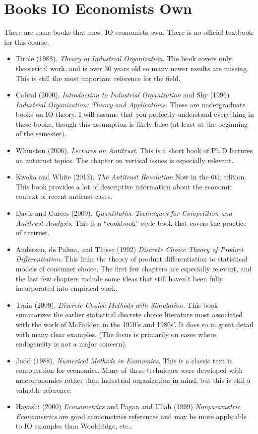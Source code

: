 \documentclass[11pt]{article}
\begin{document}
\section*{Books IO Economists Own}
These are some books that most IO economists own. There is no official textbook for this course.
\begin{itemize}
\item Tirole (1988). \textit{Theory of Industrial Organization}. The book covers only theoretical work, and is over 30 years old so many newer results are missing. This is still the most important reference for the field.
\item Cabral (2000). \textit{Introduction to Industrial Organization} and Shy (1996) \textit{Industrial Organization: Theory and Applications}. These are undergraduate books on IO theory. I will assume that you perfectly understand everything in these books, though this assumption is likely false (at least at the beginning of the semester).
\item Whinston (2006). \textit{Lectures on Antitrust}. This is a short book of Ph.D lectures on antitrust topics. The chapter on vertical issues is especially relevant.
\item Kwoka and White (2013). \textit{The Antitrust Revolution} Now in the 6th edition. This book provides a lot of descriptive information about the economic context of recent antirust cases.
\item Davis and Garces (2009). \textit{Quantitative Techniques for Competition and Antitrust Analysis}. This is a ``cookbook'' style book that covers the practice of antirust.
\item Anderson, de Palma, and Thisse (1992) \textit{Discrete Choice Theory of Product Differentiation}. This links the theory of product differentiation to statistical models of consumer choice. The first few chapters are especially relevant, and the last few chapters include some ideas that still haven't been fully incorporated into empirical work.
\item Train (2009). \textit{Discrete Choice Methods with Simulation}. This book summarizes the earlier statistical discrete choice literature most associated with the work of McFadden in the 1970's and 1980s'. It does so in great detail with many clear examples. (The focus is primarily on cases where endogeneity is not a major concern).
\item Judd (1988). \textit{Numerical Methods in Economics}. This is a classic text in computation for economics. Many of these techniques were developed with macroeonomics rather than industrial organization in mind, but this is still a valuable reference.
\item Hayashi (2000) \textit{Econometrics} and Pagan and Ullah (1999) \textit{Nonparametric Econometrics} are good econometrics references and may be more applicable to IO examples than Wooldridge, etc.. 
\end{itemize} 
\end{document}
